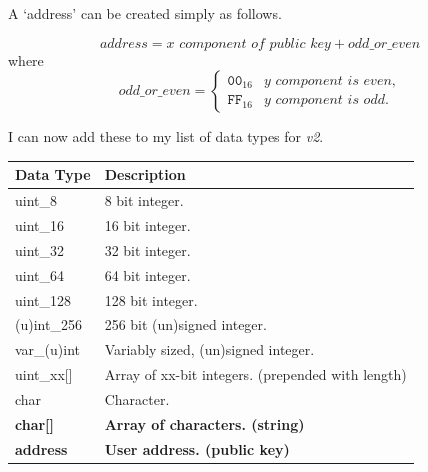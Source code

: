 \documentclass{article}
\begin{document}
A `address' can be created simply as follows.

\[ \textit{address} = \textit{x component of public key} + \textit{odd\_or\_even} \]
where
\[\textit{odd\_or\_even} = 
\begin{cases}
    \texttt{00}_{16} &\textit{y component is even,} \\[6pt]
    \texttt{FF}_{16} &\textit{y component is odd.}
\end{cases}
\]

I can now add these to my list of data types for \textit{v2}.

\begin{table}[H]
\centering
\begin{tabular}{|l|p{8.5cm}|}
\hline
\rowcolor{tblgrey} 
Data Type  & Description                \\ \hline
uint\_8     & 8 bit integer.            \\ \hline
uint\_16    & 16 bit integer.           \\ \hline
uint\_32    & 32 bit integer.           \\ \hline
uint\_64    & 64 bit integer.           \\ \hline
uint\_128   & 128 bit integer.          \\ \hline
(u)int\_256   & 256 bit (un)signed integer.          \\ \hline
var\_(u)int   & Variably sized, (un)signed integer.    \\ \hline
uint\_xx[\hspace{0.05cm}] & Array of xx-bit integers. (prepended with length) \\ \hline
char        & Character.                \\ \hline
\textbf{char[\hspace{0.05cm}]} & \textbf{Array of characters. (string)} \\ \hline
\textbf{address}     & \textbf{User address. (public key)}     \\ \hline
\end{tabular}
\end{table}
\end{document}
